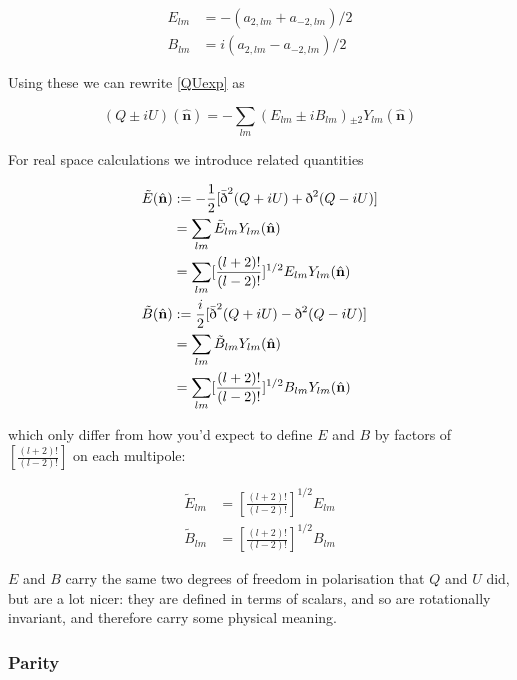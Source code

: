 \documentclass[a4paper,10pt]{article}
\renewcommand{\v}[1]{\mathbf{#1}}
\newcommand{\half}{\frac{1}{2}}
\newcommand{\unit}[1]{\hat{\v{#1}}}
\newcommand{\sr}{\text{\normalfont\dh}}
\renewcommand{\sl}{\bar{\text{\normalfont\dh}}}
\newcommand{\ltwo}{[\frac{(l+2)!}{(l-2)!}]}
\begin{document}
\begin{equation}\begin{split} 
E_{lm} &= -(a_{2,lm} + a_{-2,lm})/2\\
B_{lm} &= i(a_{2,lm} - a_{-2,lm})/2
\end{split}\end{equation}

Using these we can rewrite \ref{QUexp} as 

\begin{equation}
(Q\pm iU)(\unit{n}) = -\sum_{lm} (E_{lm} \pm i B_{lm}) {}_{\pm2}Y_{lm}(\unit{n})
\label{QUEB}
\end{equation}

For real space calculations we introduce related quantities 

\begin{equation}\begin{split}
\tilde{E}(\unit{n}) &:= -\half[\sl^2(Q+iU) + \sr^2(Q-iU)]\\
&= \sum_{lm} \tilde{E}_{lm}Y_{lm}(\unit{n})\\
&= \sum_{lm} \ltwo^{1/2}E_{lm}Y_{lm}(\unit{n})\\
\tilde{B}(\unit{n}) &:= \frac{i}{2}[\sl^2(Q+iU) - \sr^2(Q-iU)]\\
&= \sum_{lm} \tilde{B}_{lm}Y_{lm}(\unit{n})\\
&= \sum_{lm} \ltwo^{1/2}B_{lm}Y_{lm}(\unit{n})
\label{EBmodes}
\end{split}\end{equation}

which only differ from how you'd expect to define $E$ and $B$ by factors of $\ltwo$ on each multipole: 

\begin{equation}\begin{split}
\tilde{E}_{lm}&=\ltwo^{1/2}E_{lm}\\
\tilde{B}_{lm}&=\ltwo^{1/2}B_{lm}
\label{EBtwiddle}
\end{split}\end{equation}

$E$ and $B$ carry the same two degrees of freedom in polarisation that $Q$ and $U$ did, but are a lot nicer: they are defined in terms of scalars, and so are rotationally invariant, and therefore carry some physical meaning.

\subsubsection{Parity}
\end{document}
